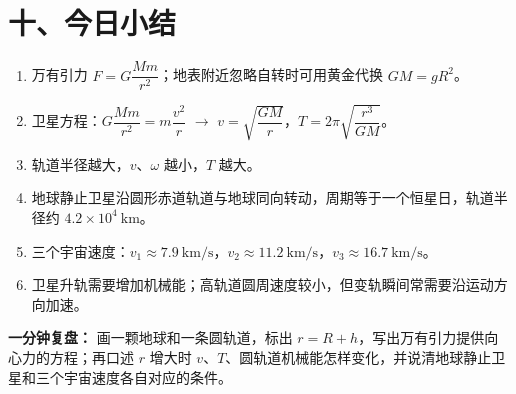 \section*{十、今日小结}
\enlargethispage{4\baselineskip}

{\small
\begin{enumerate}[nosep]
  \item 万有引力 $F = G\dfrac{Mm}{r^2}$；地表附近忽略自转时可用黄金代换 $GM=gR^2$。
  \item 卫星方程：$G\dfrac{Mm}{r^2} = m\dfrac{v^2}{r}$ $\to$ $v = \sqrt{\dfrac{GM}{r}}$，$T = 2\pi\sqrt{\dfrac{r^3}{GM}}$。
  \item 轨道半径越大，$v$、$\omega$ 越小，$T$ 越大。
  \item 地球静止卫星沿圆形赤道轨道与地球同向转动，周期等于一个恒星日，轨道半径约 $4.2\times10^4\ \mathrm{km}$。
  \item 三个宇宙速度：$v_1\approx 7.9\ \mathrm{km/s}$，$v_2\approx 11.2\ \mathrm{km/s}$，$v_3\approx 16.7\ \mathrm{km/s}$。
  \item 卫星升轨需要增加机械能；高轨道圆周速度较小，但变轨瞬间常需要沿运动方向加速。
\end{enumerate}

\textbf{一分钟复盘：} 画一颗地球和一条圆轨道，标出 $r=R+h$，写出万有引力提供向心力的方程；再口述 $r$ 增大时 $v$、$T$、圆轨道机械能怎样变化，并说清地球静止卫星和三个宇宙速度各自对应的条件。
}
